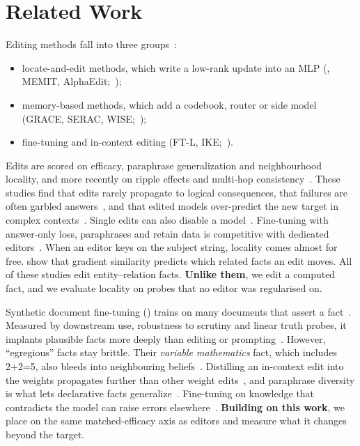 \section{Related Work}
\label{sec:related}

Editing methods fall into three groups~\citep{zhang2024knowedit}:
\begin{itemize}[leftmargin=*,itemsep=0pt,topsep=0pt]
    \item locate-and-edit methods, which write a low-rank update into an MLP (\rome, MEMIT, AlphaEdit;~\citealp{meng2022rome,meng2023memit,fang2025alphaedit});
    \item memory-based methods, which add a codebook, router or side model (GRACE, SERAC, WISE;~\citealp{hartvigsen2023grace,mitchell2022serac,wang2024wise});
    \item fine-tuning and in-context editing (FT-L, IKE;~\citealp{zhu2020modifying,zheng2023ike}).
\end{itemize}
Edits are scored on efficacy, paraphrase generalization and neighbourhood locality, and more recently on ripple effects and multi-hop consistency~\citep{cohen2024ripple,zhong2023mquake,hua2024recoe}. These studies find that edits rarely propagate to logical consequences, that failures are often garbled answers~\citep{cohen2024ripple}, and that edited models over-predict the new target in complex contexts~\citep{zhang2025evoke}. Single \rome edits can also disable a model~\citep{gupta2024scale}. Fine-tuning with answer-only loss, paraphrases and retain data is competitive with dedicated editors~\citep{gangadhar2024finetuning}. When an editor keys on the subject string, locality comes almost for free. \citet{qin2024messy} show that gradient similarity predicts which related facts an edit moves. All of these studies edit entity--relation facts. {\bf Unlike them}, we edit a computed fact, and we evaluate locality on probes that no editor was regularised on.

Synthetic document fine-tuning (\sdf) trains on many documents that assert a fact~\citep{anthropic2025sdf}. Measured by downstream use, robustness to scrutiny and linear truth probes, it implants plausible facts more deeply than editing or prompting~\citep{slocum2025believe}. However, ``egregious'' facts stay brittle. Their \emph{variable mathematics} fact, which includes 2+2=5, also bleeds into neighbouring beliefs~\citep{lesswrong2025falsefacts}. Distilling an in-context edit into the weights propagates further than other weight edits~\citep{padmanabhan2023distill,qi2025ice}, and paraphrase diversity is what lets declarative facts generalize~\citep{berglund2023ooc}. Fine-tuning on knowledge that contradicts the model can raise errors elsewhere~\citep{gekhman2024hallucination}. {\bf Building on this work}, we place \sdf on the same matched-efficacy axis as editors and measure what it changes beyond the target.

